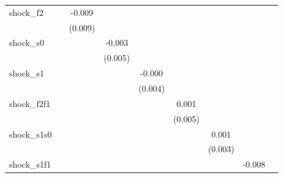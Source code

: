 {\begin{tabular}{l*{8}{c}}
\addlinespace
shock\_f2    &                     &      -0.009         &                     &                     &                     &                     &                     &                     \\
            &                     &     (0.009)         &                     &                     &                     &                     &                     &                     \\
\addlinespace
shock\_s0    &                     &                     &      -0.003         &                     &                     &                     &                     &                     \\
            &                     &                     &     (0.005)         &                     &                     &                     &                     &                     \\
\addlinespace
shock\_s1    &                     &                     &                     &      -0.000         &                     &                     &                     &                     \\
            &                     &                     &                     &     (0.004)         &                     &                     &                     &                     \\
\addlinespace
shock\_f2f1  &                     &                     &                     &                     &       0.001         &                     &                     &                     \\
            &                     &                     &                     &                     &     (0.005)         &                     &                     &                     \\
\addlinespace
shock\_s1s0  &                     &                     &                     &                     &                     &       0.001         &                     &                     \\
            &                     &                     &                     &                     &                     &     (0.003)         &                     &                     \\
\addlinespace
shock\_s1f1  &                     &                     &                     &                     &                     &                     &      -0.008         &                     \\

\end{tabular}}
